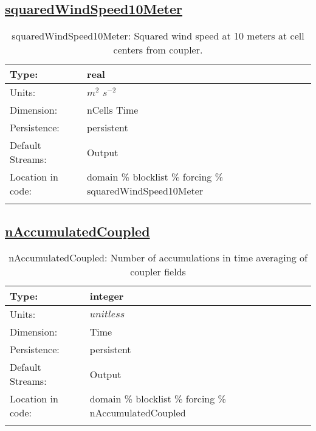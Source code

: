 \subsection[squaredWindSpeed10Meter]{\hyperref[sec:var_tab_forcing]{squaredWindSpeed10Meter}}
\label{subsec:var_sec_forcing_squaredWindSpeed10Meter}
\begin{center}
\begin{longtable}{| p{2.0in} | p{4.0in} |}
        \hline 
        Type: & real \\
        \hline 
        Units: & $m^2$ $s^{-2}$ \\
        \hline 
        Dimension: & nCells Time \\
        \hline 
        Persistence: & persistent \\
        \hline 
		 Default Streams: & Output  \\
        \hline 
		 Location in code: & domain \% blocklist \% forcing \% squaredWindSpeed10Meter \\
		 \hline 
    \caption{squaredWindSpeed10Meter: Squared wind speed at 10 meters at cell centers from coupler.}
\end{longtable}
\end{center}
\subsection[nAccumulatedCoupled]{\hyperref[sec:var_tab_forcing]{nAccumulatedCoupled}}
\label{subsec:var_sec_forcing_nAccumulatedCoupled}
\begin{center}
\begin{longtable}{| p{2.0in} | p{4.0in} |}
        \hline 
        Type: & integer \\
        \hline 
        Units: & $unitless$ \\
        \hline 
        Dimension: & Time \\
        \hline 
        Persistence: & persistent \\
        \hline 
		 Default Streams: & Output  \\
        \hline 
		 Location in code: & domain \% blocklist \% forcing \% nAccumulatedCoupled \\
		 \hline 
    \caption{nAccumulatedCoupled: Number of accumulations in time averaging of coupler fields}
\end{longtable}
\end{center}

